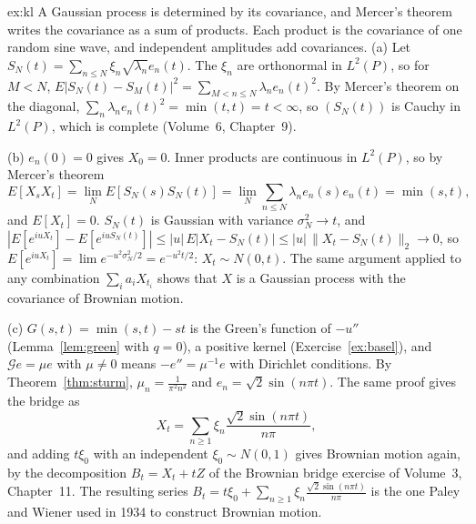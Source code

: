 \begin{solution}{ex:kl}
\idea A Gaussian process is determined by its covariance, and Mercer's theorem writes the covariance as a sum of products. Each product is the covariance of one random sine wave, and independent amplitudes add
covariances.
\writeup (a) Let $S_N(t)=\sum_{n\le N}\xi_n\sqrt{\lambda_n}e_n(t)$. The $\xi_n$ are orthonormal in $L^2(P)$, so for $M<N$, $E|S_N(t)-S_M(t)|^2=\sum_{M<n\le N}\lambda_ne_n(t)^2$. By Mercer's theorem on the diagonal,
$\sum_n\lambda_ne_n(t)^2=\min(t,t)=t<\infty$, so $(S_N(t))$ is Cauchy in $L^2(P)$, which is complete (Volume~6, Chapter~9).

(b) $e_n(0)=0$ gives $X_0=0$. Inner products are continuous in $L^2(P)$, so by Mercer's theorem
\[E[X_sX_t]=\lim_NE[S_N(s)S_N(t)]=\lim_N\sum_{n\le N}\lambda_ne_n(s)e_n(t)=\min(s,t),\]
and $E[X_t]=0$. $S_N(t)$ is Gaussian
with variance $\sigma_N^2\to t$, and $|E[e^{iuX_t}]-E[e^{iuS_N(t)}]|\le|u|\,E|X_t-S_N(t)|\le|u|\,\|X_t-S_N(t)\|_2\to0$, so $E[e^{iuX_t}]=\lim e^{-u^2\sigma_N^2/2}=e^{-u^2t/2}$: $X_t\sim N(0,t)$. The same argument applied
to any combination $\sum_ia_iX_{t_i}$ shows that $X$ is a Gaussian process with the covariance of Brownian motion.

(c) $G(s,t)=\min(s,t)-st$ is the Green's function of $-u''$ (Lemma~\ref{lem:green} with $q=0$), a positive kernel (Exercise~\ref{ex:basel}), and $\mathcal Ge=\mu e$ with $\mu\neq0$ means $-e''=\mu^{-1}e$ with Dirichlet conditions. By
Theorem~\ref{thm:sturm}, $\mu_n=\frac1{\pi^2n^2}$ and $e_n=\sqrt2\sin(n\pi t)$. The same proof gives the bridge as
\[X_t=\sum_{n\ge1}\xi_n\frac{\sqrt2\sin(n\pi t)}{n\pi},\]
and adding $t\xi_0$ with an independent $\xi_0\sim N(0,1)$ gives Brownian motion again, by the decomposition $B_t=X_t+tZ$ of the Brownian bridge exercise of Volume~3, Chapter~11. The resulting series
$B_t=t\xi_0+\sum_{n\ge1}\xi_n\frac{\sqrt2\sin(n\pi t)}{n\pi}$ is the one Paley and Wiener used in 1934 to construct Brownian motion.
\end{solution}

